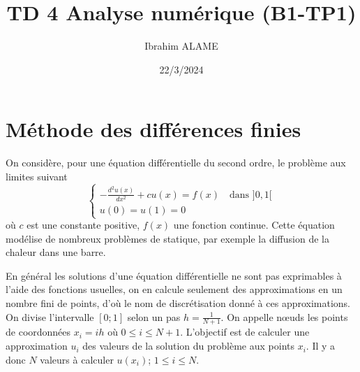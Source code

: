 \documentclass[a4paper]{article}
\title{TD 4 Analyse numérique (B1-TP1)}
\author{Ibrahim ALAME}
\date{22/3/2024}
\begin{document}
\maketitle



\section{Méthode des différences finies}
 On considère, pour une équation différentielle du second ordre, le problème aux limites suivant
\[\left\{\begin{array}{l}
-\frac{d^2u(x)}{dx^2}+c u(x)=f(x)\quad\mbox{dans }]0,1[\\
u(0)=u(1)=0
\end{array}\right.
\]
où $c$ est une constante positive, $f(x)$ une fonction continue. Cette équation modélise de nombreux problèmes de statique, par exemple la diffusion de la chaleur dans une barre.

En général les solutions d'une équation
différentielle ne sont pas exprimables à l'aide des fonctions usuelles, on en calcule seulement des
approximations en un nombre fini de points, d'où le nom de discrétisation donné à ces approximations.
On divise l'intervalle $[0; 1]$ selon un pas $h = \frac 1{N+1}$. On appelle nœuds les points de coordonnées $x_i = ih$ où $0\leq i\leq N+1$. L'objectif est de calculer une approximation $u_i$ des valeurs de la solution du problème aux points $x_i$. Il y a donc $N$ valeurs à calculer $u(x_i)$;  $1\leq i\leq N$. 
\end{document}
